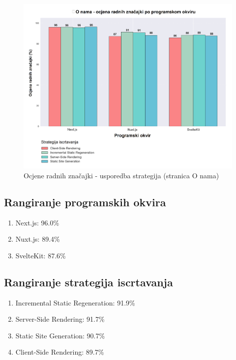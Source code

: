 \begin{figure}[H]
    \centering
    \includegraphics[width=\textwidth]{slike/rezultati/about/about_strategy_comparison.png}
    \caption{Ocjene radnih značajki - usporedba strategija (stranica O nama)}
    \label{fig:testiranje-o-nama-usporedba-strategija}
\end{figure}

\newpage

\subsection{Rangiranje programskih okvira}
\begin{enumerate}
    \item Next.js: 96.0\%
    \item Nuxt.js: 89.4\%
    \item SvelteKit: 87.6\%
\end{enumerate}

\subsection{Rangiranje strategija iscrtavanja}
\begin{enumerate}
    \item Incremental Static Regeneration: 91.9\%
    \item Server-Side Rendering: 91.7\%
    \item Static Site Generation: 90.7\%
    \item Client-Side Rendering: 89.7\%
\end{enumerate}

